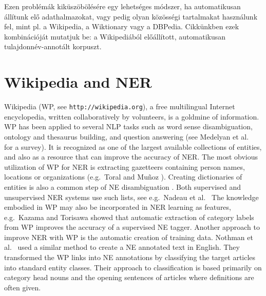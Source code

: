 \documentclass{llncs}
\begin{document}
Ezen problémák kiküszöbölésére egy lehetséges módszer, ha automatikusan állítunk elő  
adathalmazokat, vagy pedig olyan közösségi tartalmakat használunk fel, mint pl. a Wikipedia, a Wiktionary vagy a DBPedia. Cikkünkben ezek kombinációját mutatjuk be: a Wikipediából előállított, automatikusan tulajdonnév-annotált korpuszt.  



\section{Wikipedia and NER}

Wikipedia (WP, see {\tt http://wikipedia.org}), a free
multilingual Internet encyclopedia, written collaboratively by volunteers, is
a goldmine of information.
WP has been applied to several NLP tasks such as word sense
disambiguation, ontology and thesaurus building, and question answering (see
Medelyan et al.~\cite{Medelyan:09} for a survey). It is recognized as one
of the largest available collections of entities, and also as a resource that
can improve the accuracy of NER. The most obvious utilization of WP for NER is
extracting gazetteers containing person names, locations or organizations
(e.g.~Toral and Mu\~noz \cite{Toral:06}). Creating dictionaries of
entities is also a common step of NE disambiguation
\cite{Bunescu:06,Cucerzan:07}. Both supervised and unsupervised NER systems
use such lists, see e.g.~Nadeau et al.~\cite{Nadeau:06} The knowledge
embodied in WP may also be incorporated in NER learning as features,
e.g.~Kazama and Torisawa \cite{Kazama:07} showed that automatic
extraction of category labels from WP improves the accuracy of a supervised NE
tagger.
Another approach to improve NER with WP is the automatic creation of training
data. Nothman et al.~\cite{Nothman:08} used a similar method to create
a NE annotated text in English. They transformed the WP links into NE
annotations by classifying the target articles into standard entity
classes. Their approach to classification is based primarily on category head
nouns and the opening sentences of articles where definitions are often given.
\end{document}

